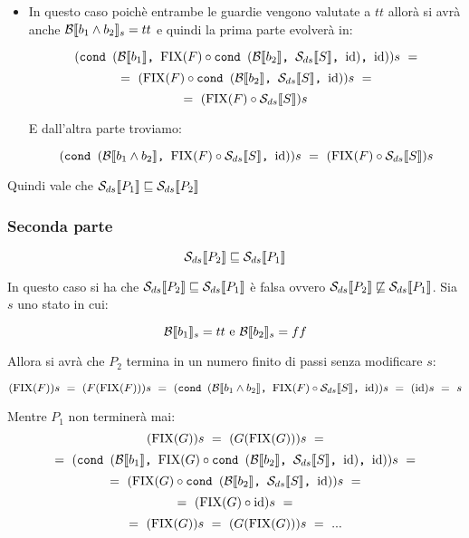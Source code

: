 {\begin{itemize}
        Poichè 
        $\evalBbs{b_2}{s}=ff$ anche in questo caso si avrà che 
        $\evalBbs{b_1\and{}b_2}{s}=ff$ e quindi la prima parte evolverà in
        questo modo:

        \[ (\cond{b_1}{\fixp{F} \circ \cond{b_2}{\Sds}{\idDS}}{\idDS})s~= \]
       \[  =~(\fixp{F} \circ \cond{b_2}{\Sds}{\idDS})s~= \]
       \[  =~(\fixp{F} \circ \idDS)s~=~(\fixp{F})s~=~(F(\fixp{F}))s~= \]
       \[  =~(\cond{b_1\and{}b_2}{\fixp{F} \circ \Sds}{\idDS})s~=~(\idDS)s~=~s \]
       
        E quindi dall'altra parte similmente avremo:
       
        \[ (\cond{b_1\and{}b_2}{\fixp{F} \circ \Sds}{\idDS})s~=~(\idDS)s~=~s \]
   
        \item {} 
        
        In questo
        caso poichè entrambe le guardie vengono valutate a $tt$ allorà si avrà
        anche $\evalBbs{b_1\and{}b_2}{s}=tt$ e quindi la prima parte evolverà
        in:
        
        \[ (\cond{b_1}{\fixp{F} \circ \cond{b_2}{\Sds}{\idDS}}{\idDS})s~= \]
       \[  =~(\fixp{F} \circ \cond{b_2}{\Sds}{\idDS})s~= \]
        \[ =~(\fixp{F} \circ \Sds)s \]
       
        E dall'altra parte troviamo:
       
        \[ (\cond{b_1\and{}b_2}{\fixp{F} \circ \Sds}{\idDS})s~
        =~(\fixp{F} \circ \Sds)s \]
    
    \end{itemize}
    Quindi vale che $\dsCtxt{P_1} \mineq \dsCtxt{P_2}$

    \subsubsection{Seconda parte} 
    \[ \dsCtxt{P_2}  \mineq \dsCtxt{P_1} \]
    
    In questo caso si ha che $\dsCtxt{P_2} \mineq \dsCtxt{P_1}$ è falsa ovvero
    $\dsCtxt{P_2} \notmineq \dsCtxt{P_1}$. Sia $s$ uno stato in cui:

    \[ \evalBbs{b_1}{s}=tt $ e $ \evalBbs{b_2}{s}=ff \]
   
    Allora si avrà che $P_2$ termina in un numero finito di passi senza
    modificare $s$:
    
    \[ (\fixp{F})s~=~(F(\fixp{F}))s~=~
    (\cond{b_1\and{}b_2}{\fixp{F} \circ \Sds}{\idDS})s~=~(\idDS)s~=~s \]
    
    Mentre $P_1$ non terminerà mai:
    \[ (\fixp{G})s~=~(G(\fixp{G}))s~= \]
    \[ =~(\cond{b_1}{\fixp{G} \circ \cond{b_2}{\Sds}{\idDS}}{\idDS})s~= \]
    \[ =~(\fixp{G} \circ \cond{b_2}{\Sds}{\idDS})s~= \]
    \[ =~(\fixp{G} \circ \idDS)s~= \]
    \[ =~ (\fixp{G})s~=~(G(\fixp{G}))s~=~... \]
   
}
\newpage